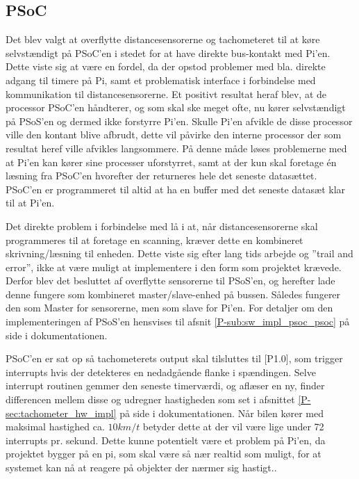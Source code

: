 \subsection{PSoC} \label{sec:swd_psoc_board}

Det blev valgt at overflytte distancesensorerne og tachometeret til at køre selvstændigt på PSoC'en i stedet for at have direkte bus-kontakt med Pi'en. 
Dette viste sig at være en fordel, da der opstod problemer med bla. direkte adgang til timere på Pi, samt et problematisk interface i forbindelse med \IIC kommunikation til distancesensorerne.
Et positivt resultat heraf blev, at de processor PSoC'en håndterer, og som skal ske meget ofte, nu kører selvstændigt på PSoS'en og dermed ikke forstyrre Pi'en.
Skulle Pi'en afvikle de disse processor ville den kontant blive afbrudt, dette vil påvirke den interne processor der som resultat heref ville afvikles langsommere.
På denne måde løses problemerne med at Pi'en kan kører sine processer uforstyrret, samt at der kun skal foretage én læsning fra PSoC'en hvorefter der returneres hele det seneste datasættet. 
PSoC'en er programmeret til altid at ha en buffer med det seneste datasæt klar til at Pi'en. 

Det direkte problem i forbindelse med \IIC lå i at, når distancesensorerne skal programmeres til at foretage en scanning, kræver dette en kombineret skrivning/læsning til enheden. 
Dette viste sig efter lang tids arbejde og ''trail and error'', ikke at være muligt at implementere i den form som projektet krævede. 
Derfor blev det besluttet af overflytte sensorerne til PSoS'en, og herefter lade denne fungere som kombineret master/slave-enhed på \IIC bussen. 
Således fungerer den som Master for sensorerne, men som slave for Pi'en. For detaljer om den implementeringen af PSoS'en hensvises til afsnit \ref{P-sub:sw_impl_psoc_psoc}  på side \pageref{P-sub:sw_impl_psoc_psoc} i dokumentationen.

PSoC'en er sat op så tachometerets output skal tilsluttes til [P1.0], som trigger interrupts hvis der detekteres en nedadgående flanke i spændingen. 
Selve interrupt routinen gemmer den seneste timerværdi, og aflæser en ny, finder differencen mellem disse og udregner hastigheden som set i afsnittet 
\ref{P-sec:tachometer_hw_impl}  på side \pageref{P-sec:tachometer_hw_impl} i dokumentationen. 
Når bilen kører med maksimal hastighed ca. $10km/t$ betyder dette at der vil være lige under 72 interrupts pr. sekund. 
Dette kunne potentielt være et problem på Pi'en, da projektet bygger på en pi, som skal være så nær realtid som muligt, for at systemet kan nå at reagere på objekter der nærmer sig hastigt..


